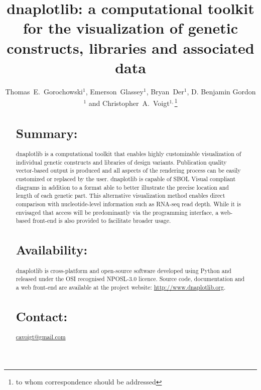 \documentclass{bioinfo}
\begin{document}

\title[dnaplotlib]{dnaplotlib: a computational toolkit for the visualization of genetic constructs, libraries and associated data}
\author[Thomas E. Gorochowski \textit{et~al.}]{Thomas~E.~Gorochowski$^{1}$, Emerson~Glassey$^{1}$, Bryan~Der$^{1}$, D. Benjamin Gordon$^{1}$ and Christopher~A.~Voigt$^{1,}$\footnote{to whom correspondence should be addressed}}
\address{$^{1}$Department of Biological Engineering, Synthetic Biology Center, Massachusetts Institute of Technology, USA.}



\maketitle

\begin{abstract}

\section{Summary:}
dnaplotlib is a computational toolkit that enables highly customizable visualization of individual genetic constructs and libraries of design variants. Publication quality vector-based output is produced and all aspects of the rendering process can be easily customized or replaced by the user. dnaplotlib is capable of SBOL Visual compliant diagrams in addition to a format able to better illustrate the precise location and length of each genetic part. This alternative visualization method enables direct comparison with nucleotide-level information such as RNA-seq read depth. While it is envisaged that access will be predominantly via the programming interface, a web-based front-end is also provided to facilitate broader usage.

\section{Availability:}
dnaplotlib is cross-platform and open-source software developed using Python and released under the OSI recognised NPOSL-3.0 licence. Source code, documentation and a web front-end are available at the project website: \href{http://www.dnaplotlib.org}{http://www.dnaplotlib.org}.

\section{Contact:} \href{cavoigt@gmail.com}{cavoigt@gmail.com}
\end{abstract}
\end{document}
